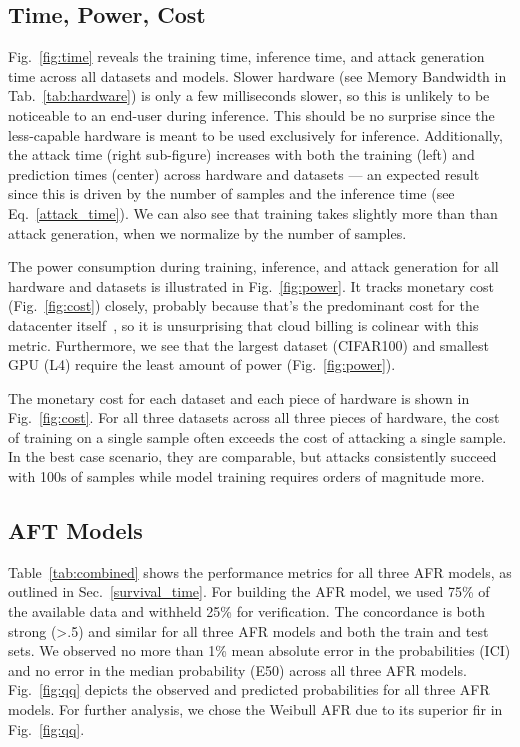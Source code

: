 \documentclass[conference]{IEEEtran}
\begin{document}
\subsection{Time, Power, Cost}
\label{res:cost}
Fig.~\ref{fig:time} reveals the training time, inference time, and attack generation time across all datasets and models. Slower hardware (see Memory Bandwidth in Tab.~\ref{tab:hardware}) is only a few milliseconds slower, so this is unlikely to be noticeable to an end-user during inference. This should be no surprise since the less-capable hardware is meant to be used exclusively for inference. Additionally, the attack time (right sub-figure) increases with both the training (left) and prediction times (center) across hardware and datasets --- an expected result since this is driven by the number of samples and the inference time (see Eq.~\ref{attack_time}). We can also see that training takes slightly more than than attack generation, when we normalize by the number of samples.

The power consumption during training, inference, and attack generation for all hardware and datasets is illustrated in Fig.~\ref{fig:power}. It tracks monetary cost (Fig.~\ref{fig:cost}) closely, probably because that's the predominant cost for the datacenter itself~\cite{dayarathna2015data}, so it is unsurprising that cloud billing is colinear with this metric. Furthermore, we see that the largest dataset (CIFAR100) and smallest GPU (L4) require the least amount of power (Fig.~\ref{fig:power}). 

The monetary cost for each dataset and each piece of hardware is shown in Fig.~\ref{fig:cost}. For all three datasets across all three pieces of hardware, the cost of training on a single sample often exceeds the cost of attacking a single sample. In the best case scenario, they are comparable, but attacks consistently succeed with 100s of samples while model training requires orders of magnitude more.

\subsection{AFT Models}
\label{res:afr}
Table~\ref{tab:combined} shows the performance metrics for all three AFR models, as outlined in Sec.~\ref{survival_time}. For building the AFR model, we used 75\% of the available data and withheld 25\% for verification. The concordance is both strong (>.5) and similar for all three AFR models and both the train and test sets. We observed no more than 1\% mean absolute error in the probabilities (ICI) and no error in the median probability (E50) across all three AFR models. Fig.~\ref{fig:qq} depicts the observed and predicted probabilities for all three AFR models. For further analysis, we chose the Weibull AFR due to its superior fir in  Fig.~\ref{fig:qq}.

\end{document}
